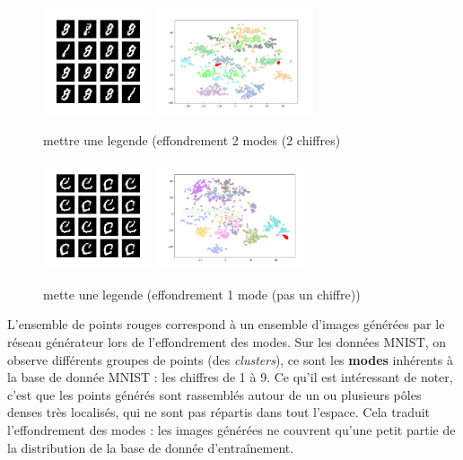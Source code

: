\begin{figure}[!h]
\centering
\includegraphics[height=90pt]{"images/modes1"}
\includegraphics[height=90pt]{"images/modes1_tsne"}
\caption{mettre une legende (effondrement 2 modes (2 chiffres)}
\includegraphics[height=90pt]{"images/modes2"}
\includegraphics[height=90pt]{"images/modes2_tsne"}
\caption{mette une legende (effondrement 1 mode (pas un chiffre))}
\end{figure}

L'ensemble de points rouges correspond à un ensemble d'images générées par le réseau générateur lors de l'effondrement des modes. Sur les données MNIST, on observe différents groupes de points (des \textit{clusters}), ce sont les \textbf{modes} inhérents à la base de donnée MNIST : les chiffres de 1 à 9. Ce qu'il est intéressant de noter, c'est que les points générés sont rassemblés autour de un ou plusieurs pôles denses très localisés, qui ne sont pas répartis dans tout l'espace. Cela traduit l'effondrement des modes : les images générées ne couvrent qu'une petit partie de la distribution de la base de donnée d’entraînement.\\

